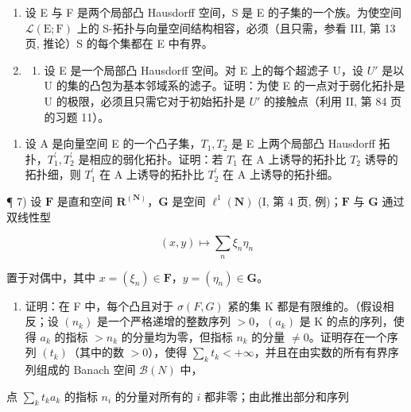 \begin{enumerate}
\def\labelenumi{\arabic{enumi})}
\setcounter{enumi}{4}
\item
  设 E 与 F 是两个局部凸 Hausdorff 空间，S 是 E 的子集的一个族。为使空间 \(\mathcal{L}(\mathrm{E};\mathrm{F})\) 上的 S-拓扑与向量空间结构相容，必须（且只需，参看 III, 第 13 页, 推论）S 的每个集都在 E 中有界。
\item
  \begin{enumerate}
  \def\labelenumii{\alph{enumii})}
  \tightlist
  \item
    设 E 是一个局部凸 Hausdorff 空间。对 E 上的每个超滤子 U，设 \(U'\) 是以 U 的集的凸包为基本邻域系的滤子。证明：为使 E 的一点对于弱化拓扑是 U 的极限，必须且只需它对于初始拓扑是 \(U'\) 的接触点（利用 II, 第 84 页 的习题 11）。
  \end{enumerate}
\end{enumerate}

\begin{enumerate}
\def\labelenumi{\alph{enumi})}
\setcounter{enumi}{1}
\tightlist
\item
  设 A 是向量空间 E 的一个凸子集，\(T_{1}, T_{2}\) 是 E 上两个局部凸 Hausdorff 拓扑，\(T_{1}^{\prime}, T_{2}^{\prime}\) 是相应的弱化拓扑。证明：若 \(T_{1}\) 在 A 上诱导的拓扑比 \(T_{2}\) 诱导的拓扑细，则 \(T_{1}^{\prime}\) 在 A 上诱导的拓扑比 \(T_{2}^{\prime}\) 在 A 上诱导的拓扑细。
\end{enumerate}

¶ 7) 设 \(\mathbf{F}\) 是直和空间 \(\mathbf{R}^{(\mathbf{N})}\)，\(\mathbf{G}\) 是空间 \(\ell^1 (\mathbf{N})\) (I, 第 4 页, 例)；\(\mathbf{F}\) 与 \(\mathbf{G}\) 通过双线性型

\[
(x, y) \mapsto \sum_ {n} \xi_ {n} \eta_ {n}
\]

置于对偶中，其中 \(x = (\xi_n)\in \mathbf{F}\)，\(y = (\eta_{n})\in \mathbf{G}\)。

\begin{enumerate}
\def\labelenumi{\alph{enumi})}
\tightlist
\item
  证明：在 F 中，每个凸且对于 \(\sigma(F, G)\) 紧的集 K 都是有限维的。（假设相反；设 \((n_k)\) 是一个严格递增的整数序列 \(>0\)，\((a_k)\) 是 K 的点的序列，使得 \(a_k\) 的指标 \(>n_k\) 的分量均为零，但指标 \(n_k\) 的分量 \(\neq 0\)。证明存在一个序列 \((t_k)\)（其中的数 \(>0\)），使得 \(\sum_{k} t_k < +\infty\)，并且在由实数的所有有界序列组成的 Banach 空间 \(\mathcal{B}(N)\) 中，
\end{enumerate}

点 \(\sum_{k} t_k a_k\) 的指标 \(n_i\) 的分量对所有的 \(i\) 都非零；由此推出部分和序列

